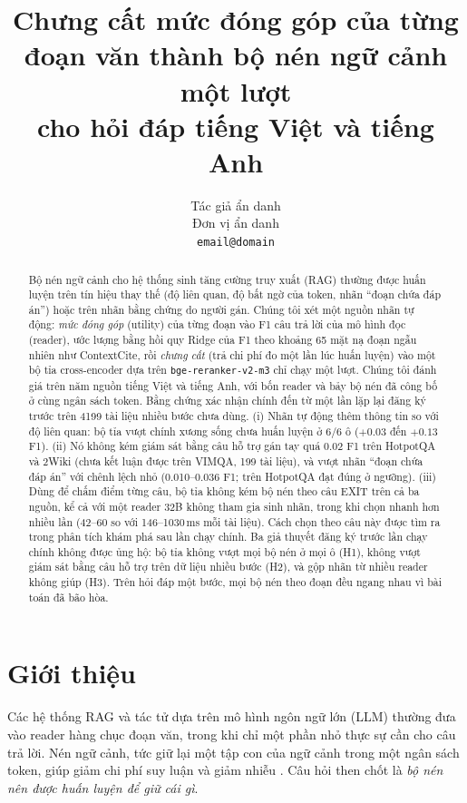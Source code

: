 \documentclass[11pt]{article}
\title{Chưng cất mức đóng góp của từng đoạn văn thành bộ nén ngữ cảnh một lượt\\
cho hỏi đáp tiếng Việt và tiếng Anh}
\author{Tác giả ẩn danh \\
  Đơn vị ẩn danh \\
  \texttt{email@domain}}
\begin{document}
\maketitle

\begin{abstract}
Bộ nén ngữ cảnh cho hệ thống sinh tăng cường truy xuất (RAG) thường được huấn luyện trên tín hiệu thay thế
(độ liên quan, độ bất ngờ của token, nhãn ``đoạn chứa đáp án'') hoặc trên nhãn bằng chứng do người gán. Chúng tôi
xét một nguồn nhãn tự động: \emph{mức đóng góp} (utility) của từng đoạn vào F1 câu trả lời của mô hình đọc
(reader), ước lượng bằng hồi quy Ridge của F1 theo khoảng 65 mặt nạ đoạn ngẫu nhiên như ContextCite, rồi
\emph{chưng cất} (trả chi phí đo một lần lúc huấn luyện) vào một bộ tỉa cross-encoder dựa trên
\texttt{bge-reranker-v2-m3} chỉ chạy một lượt. Chúng tôi đánh giá trên năm nguồn tiếng Việt và tiếng Anh, với
bốn reader và bảy bộ nén đã công bố ở cùng ngân sách token. Bằng chứng xác nhận chính đến từ một lần lặp lại
đăng ký trước trên 4199 tài liệu nhiều bước chưa dùng. (i) Nhãn tự động thêm thông tin so với độ liên quan: bộ
tỉa vượt chính xương sống chưa huấn luyện ở 6/6 ô ($+0.03$ đến $+0.13$ F1). (ii) Nó không kém giám sát bằng câu
hỗ trợ gán tay quá 0.02 F1 trên HotpotQA và 2Wiki (chưa kết luận được trên VIMQA, 199 tài liệu), và vượt nhãn
``đoạn chứa đáp án'' với chênh lệch nhỏ (0.010--0.036 F1; trên HotpotQA đạt đúng ở ngưỡng). (iii) Dùng để chấm
điểm từng câu, bộ tỉa không kém bộ nén theo câu EXIT trên cả ba nguồn, kể cả với một reader 32B không tham gia sinh
nhãn, trong khi chọn nhanh hơn nhiều lần (42--60 so với 146--1030\,ms mỗi tài liệu). Cách chọn theo câu này được
tìm ra trong phân tích khám phá sau lần chạy chính. Ba giả thuyết đăng ký trước lần chạy chính không được ủng hộ:
bộ tỉa không vượt mọi bộ nén ở mọi ô (H1), không vượt giám sát bằng câu hỗ trợ trên dữ liệu nhiều bước (H2), và
gộp nhãn từ nhiều reader không giúp (H3). Trên hỏi đáp một bước, mọi bộ nén theo đoạn đều ngang nhau vì bài toán
đã bão hòa.
\end{abstract}

\section{Giới thiệu}
\label{sec:intro}

Các hệ thống RAG và tác tử dựa trên mô hình ngôn ngữ lớn (LLM) thường đưa vào
reader hàng chục đoạn văn, trong khi chỉ một phần nhỏ thực sự cần cho câu trả
lời. Nén ngữ cảnh, tức giữ lại một tập con của ngữ cảnh trong một ngân sách
token, giúp giảm chi phí suy luận và giảm nhiễu \citep{liu2024lost}. Câu hỏi then
chốt là \emph{bộ nén nên được huấn luyện để giữ cái gì}.
\end{document}
